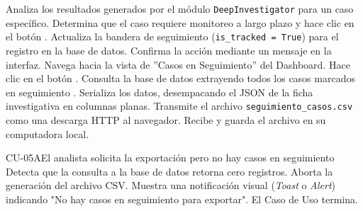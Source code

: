 \begin{UCtrayectoria}
	\UCpaso[\UCActor] Analiza los resultados generados por el módulo \texttt{DeepInvestigator} para un caso específico.
	\UCpaso[\UCActor] Determina que el caso requiere monitoreo a largo plazo y hace clic en el botón .
	\UCpaso[\UCsist] Actualiza la bandera de seguimiento (\texttt{is\_tracked = True}) para el registro en la base de datos.
	\UCpaso[\UCsist] Confirma la acción mediante un mensaje en la interfaz.
	\UCpaso[\UCActor] Navega hacia la vista de ''Casos en Seguimiento'' del Dashboard.
	\UCpaso[\UCActor] Hace clic en el botón .
	\UCpaso[\UCsist] Consulta la base de datos extrayendo todos los casos marcados en seguimiento .
	\UCpaso[\UCsist] Serializa los datos, desempacando el JSON de la ficha investigativa en columnas planas.
	\UCpaso[\UCsist] Transmite el archivo \texttt{seguimiento\_casos.csv} como una descarga HTTP al navegador.
	\UCpaso[\UCActor] Recibe y guarda el archivo en su computadora local.
\end{UCtrayectoria}

\begin{UCtrayectoriaA}{CU-05}{A}{El analista solicita la exportación pero no hay casos en seguimiento}
	\UCpaso[\UCsist] Detecta que la consulta a la base de datos retorna cero registros.
	\UCpaso[\UCsist] Aborta la generación del archivo CSV.
	\UCpaso[\UCsist] Muestra una notificación visual (\textit{Toast} o \textit{Alert}) indicando "No hay casos en seguimiento para exportar".
	\UCpaso[] El Caso de Uso termina.
\end{UCtrayectoriaA}
